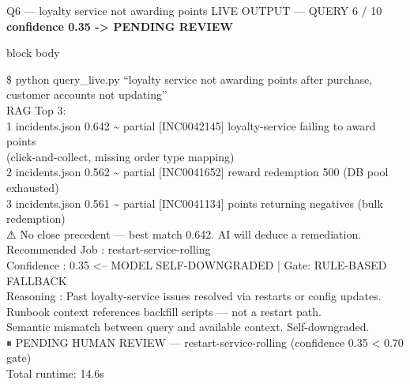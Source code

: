 \documentclass[aspectratio=169,10pt]{beamer}
\newcommand{\slidecat}[1]{{\color{cdim}\ttfamily\scriptsize\MakeUppercase{#1}}}
\newenvironment{terminal}{%
  \begin{beamercolorbox}[sep=6pt,rounded=true,shadow=false]{block body}%
  \ttfamily\tiny\color{cterm}%
}{%
  \end{beamercolorbox}%
}
\begin{document}
\begin{frame}{Q6 — loyalty service not awarding points}
  \slidecat{Live Output — Query 6 / 10}
  {\color{camber}\ttfamily\small\bfseries confidence 0.35 -> PENDING REVIEW}
  \vspace{0.15cm}
  \begin{terminal}
    \$ python query\_live.py ``loyalty service not awarding points after purchase, customer accounts not updating''\\
    \vspace{0.25em}
    RAG Top 3:\\
    \hspace*{0.4cm}1  incidents.json  0.642 \textasciitilde{} partial  [INC0042145] loyalty-service failing to award points\\
    \hspace*{0.4cm}\hspace*{0.4cm}(click-and-collect, missing order type mapping)\\
    \hspace*{0.4cm}2  incidents.json  0.562 \textasciitilde{} partial  [INC0041652] reward redemption 500 (DB pool exhausted)\\
    \hspace*{0.4cm}3  incidents.json  0.561 \textasciitilde{} partial  [INC0041134] points returning negatives (bulk redemption)\\
    \vspace{0.25em}
    ⚠ No close precedent — best match 0.642. AI will deduce a remediation.\\
    \vspace{0.25em}
    Recommended Job : {\color{camber}restart-service-rolling}\\
    Confidence      : {\color{camber}0.35  <-- MODEL SELF-DOWNGRADED}  |  Gate: {\color{camber}RULE-BASED FALLBACK}\\
    Reasoning       : Past loyalty-service issues resolved via restarts or config updates.\\
    \hspace*{0.4cm}Runbook context references backfill scripts — not a restart path.\\
    \hspace*{0.4cm}Semantic mismatch between query and available context. Self-downgraded.\\
    \vspace{0.25em}
    {\color{camber}⏸  PENDING HUMAN REVIEW  —  restart-service-rolling  (confidence 0.35 < 0.70 gate)}\\
    Total runtime: 14.6s
  \end{terminal}
\end{frame}
\end{document}
